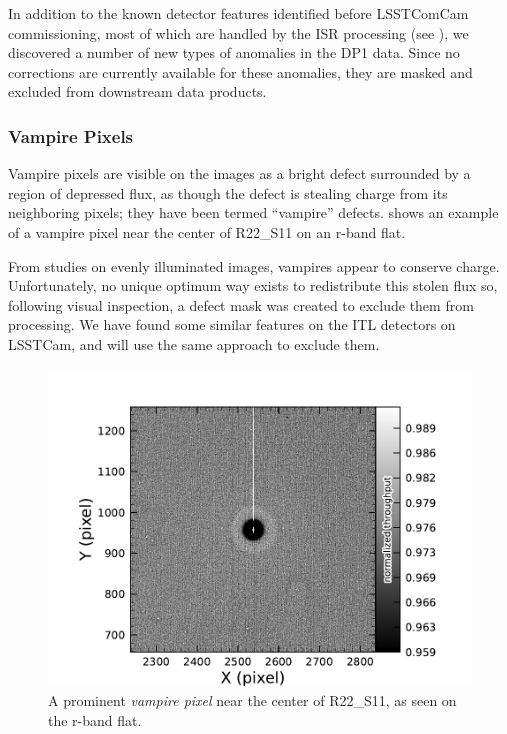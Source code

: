 In addition to the known detector features identified before LSSTComCam commissioning, most of which are handled by the ISR processing (see ), we discovered a number of new types of anomalies in the DP1 data. 
Since no corrections are currently available for these anomalies, they are masked and excluded from downstream data products.

\subsubsection{Vampire Pixels}
Vampire pixels are visible on the images as a bright defect surrounded by a region of depressed flux, as though the defect is stealing charge from its neighboring pixels; they have been termed ``vampire'' defects.
 shows an example of a vampire pixel near the center of R22\_S11 on an r-band flat.


From studies on evenly illuminated images, vampires appear to conserve charge.
Unfortunately, no unique optimum way exists to redistribute this stolen flux so, following visual inspection, a defect mask was created to exclude them from processing.
We have found some similar features on the ITL detectors on LSSTCam, and will use the same approach to exclude them.
\begin{figure}[htb!]
  \centering
  \includegraphics[width=0.98\linewidth]{figures/dp1_isr_anomalies-vampire_pixel.pdf}
  \caption{A prominent \textit{vampire pixel} near the center of R22\_S11, as seen on the r-band flat.}
  \label{fig:anomalies_vampire_pixels}
\end{figure}

